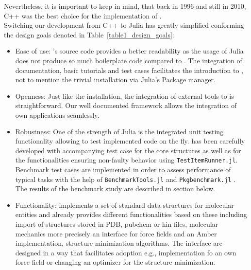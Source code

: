 Nevertheless, it is important to keep in mind, that back in 1996 and still in 2010, C++ was the best choice for the implementation of \ball. \\
Switching our development from C++ to Julia has greatly simplified conforming the design goals denoted in Table~\ref{table1_design_goals}: 
\begin{itemize}
	\item Ease of use: \biochem's source code provides a better readability  as the usage of Julia does not produce so much boilerplate code compared to \ball. The integration of documentation, basic tutorials and test cases facilitates the introduction to \biochem, not to mention the trivial installation via Julia's Package manager. 
	
	\item Openness: Just like the installation, the integration of external tools to \biochem is straightforward. Our well documented framework allows the integration of own applications seamlessly. 
	
	\item Robustness: One of the strength of Julia is the integrated unit testing functionality allowing to test implemented code on the fly. \biochem has been carefully developed with accompanying test case for the core structures as well as for the functionalities ensuring non-faulty behavior using \texttt{TestItemRunner.jl}\cite{TestItemRunner}. Benchmark test cases are implemented in order to assess performance of typical tasks with the help of \texttt{BenchmarkTools.jl} and \texttt{Pkgbenchmark.jl} \cite{BenchmarkTools.jl-2016, PkgBenchmark}. The results of the benchmark study are described in section below. 
	
	\item Functionality: \biochem implements a set of standard data structures for molecular entities and already provides different functionalities based on these including import of structures stored in PDB, pubchem or hin files, molecular mechanics more precisely an interface for force fields and an Amber implementation, structure minimization algorithms. The interface are designed in a way that facilitates adoption e.g., implementation fo an own force field or changing an optimizer for the structure minimization. 
\end{itemize}

